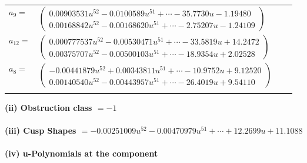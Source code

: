 \documentclass[1p]{elsarticle_modified}
\theoremstyle{definition}
\begin{document}
\begin{tabular}{m{7pt} m{180pt} m{7pt} m{180pt} }
\flushright $a_{9}=$&$\begin{pmatrix}0.00903531 u^{52}-0.0100589 u^{51}+\cdots-35.7730 u-1.19480\\0.00168842 u^{52}-0.00168620 u^{51}+\cdots-2.75207 u-1.24109\end{pmatrix}$ \\
\flushright $a_{12}=$&$\begin{pmatrix}0.000777537 u^{52}-0.00530471 u^{51}+\cdots-33.5819 u+14.2472\\0.00375707 u^{52}-0.00500103 u^{51}+\cdots-18.9354 u+2.02528\end{pmatrix}$ \\
\flushright $a_{8}=$&$\begin{pmatrix}-0.00441879 u^{52}+0.00343811 u^{51}+\cdots-10.9752 u+9.12520\\0.00140540 u^{52}-0.00443957 u^{51}+\cdots-26.4019 u+9.54110\end{pmatrix}$\\&\end{tabular}
\flushleft \textbf{(ii) Obstruction class $= -1$}\\~\\
\flushleft \textbf{(iii) Cusp Shapes $= -0.00251009 u^{52}-0.00470979 u^{51}+\cdots+12.2699 u+11.1088$}\\~\\
\newpage\renewcommand{\arraystretch}{1}
\flushleft \textbf{(iv) u-Polynomials at the component}\newline \\
\end{document}
